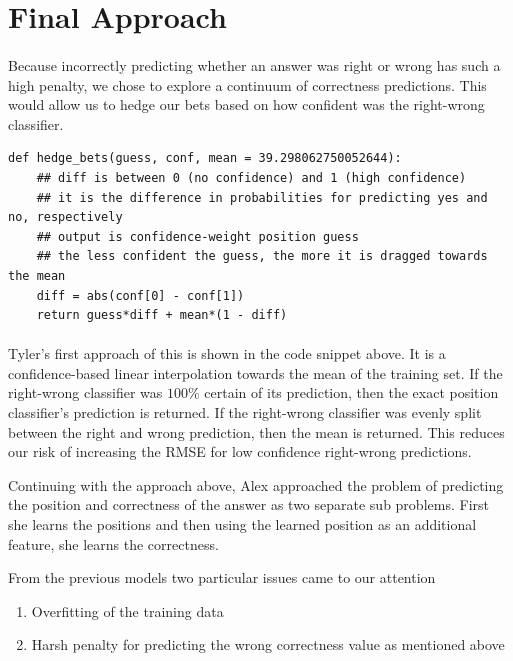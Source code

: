 \documentclass[letterpaper]{article}
\begin{document}
\section{Final Approach}

\paragraph{} Because incorrectly predicting whether an answer was right or wrong has such a high penalty, we chose to explore a continuum of correctness predictions. This would allow us to hedge our bets based on how confident was the right-wrong classifier.

\begin{minipage}{3in}
\begin{verbatim}
def hedge_bets(guess, conf, mean = 39.298062750052644):
    ## diff is between 0 (no confidence) and 1 (high confidence)
    ## it is the difference in probabilities for predicting yes and no, respectively
    ## output is confidence-weight position guess
    ## the less confident the guess, the more it is dragged towards the mean
    diff = abs(conf[0] - conf[1]) 
    return guess*diff + mean*(1 - diff)
\end{verbatim}
\end{minipage}

\paragraph{}

Tyler's first approach of this is shown in the code snippet above. It is a confidence-based linear interpolation towards the mean of the training set. If the right-wrong classifier was $100\%$ certain of its prediction, then the exact position classifier's prediction is returned. If the right-wrong classifier was evenly split between the right and wrong prediction, then the mean is returned. This reduces our risk of increasing the RMSE for low confidence right-wrong predictions.

Continuing with the approach above, Alex approached the problem of predicting the position and correctness of the answer as two separate sub problems.  First she learns the positions and then using the learned position as an additional feature, she learns the correctness.  

From the previous models two particular issues came to our attention
\begin{enumerate}
\item Overfitting of the training data
\item Harsh penalty for predicting the wrong correctness value as mentioned above
\end{enumerate}
\end{document}
